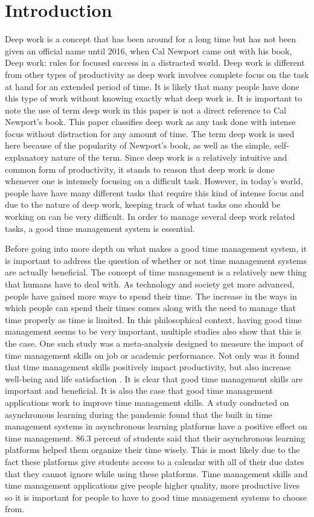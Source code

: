 \documentclass[sigconf]{acmart}
\begin{document}
\section{Introduction}
Deep work is a concept that has been around for a long time but has not been given an official name until 2016, when Cal Newport came out with his book, Deep work: rules for focused success in a distracted world. Deep work is different from other types of productivity as deep work involves complete focus on the task at hand for an extended period of time. It is likely that many people have done this type of work without knowing exactly what deep work is. It is important to note the use of term deep work in this paper is not a direct reference to Cal Newport's book. This paper classifies deep work as any task done with intense focus without distraction for any amount of time. The term deep work is used here because of the popularity of Newport's book, as well as the simple, self-explanatory nature of the term. Since deep work is a relatively intuitive and common form of productivity, it stands to reason that deep work is done whenever one is intensely focusing on a difficult task. However, in today's world, people have have many different tasks that require this kind of intense focus and due to the nature of deep work, keeping track of what tasks one should be working on can be very difficult. In order to manage several deep work related tasks, a good time management system is essential. 

    Before going into more depth on what makes a good time management system, it is important to address the question of whether or not time management systems are actually beneficial. The concept of time management is a relatively new thing that humans have to deal with. As technology and society get more advanced, people have gained more ways to spend their time. The increase in the ways in which people can spend their times comes along with the need to manage that time properly as time is limited. In this philosophical context, having good time management seems to be very important, multiple studies also show that this is the case. One such study was a meta-analysis designed to measure the impact of time management skills on job or academic performance. Not only was it found that time management skills positively impact productivity, but also increase well-being and life satisfaction \cite{work}. It is clear that good time management skills are important and beneficial. It is also the case that good time management applications work to improve time management skills. A study conducted on asynchronous learning during the pandemic found that the built in time management systems in asynchronous learning platforms have a positive effect on time management. 86.3 percent of students said that their asynchronous learning platforms helped them organize their time wisely\cite{covid}. This is most likely due to the fact these platforms give students access to a calendar with all of their due dates that they cannot ignore while using these platforms. Time management skills and time management applications give people higher quality, more productive lives so it is important for people to have to good time management systems to choose from. 
\end{document}
